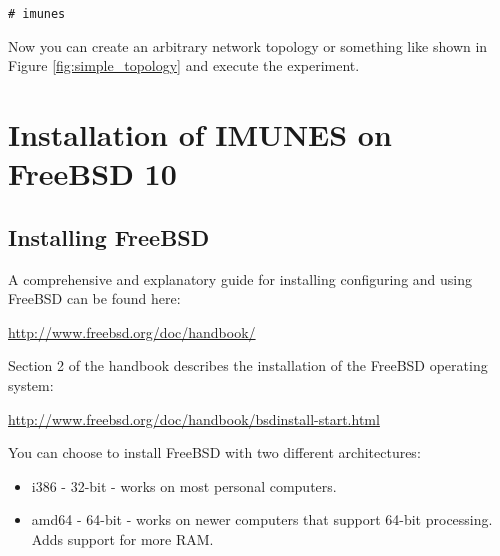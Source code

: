 \texttt{\# imunes}

Now you can create an arbitrary network topology or something like shown in
Figure \ref{fig:simple_topology} and execute the experiment.

\section{Installation of IMUNES on FreeBSD 10}

\subsection{Installing FreeBSD}
A comprehensive and explanatory guide for installing configuring and using
FreeBSD can be found here:

\begin{center}
\url{http://www.freebsd.org/doc/handbook/}
\end{center}

Section 2 of the handbook describes the installation of the FreeBSD operating
system: 
\begin{center}
\url{http://www.freebsd.org/doc/handbook/bsdinstall-start.html}
\end{center}

You can choose to install FreeBSD with two different architectures:
\begin{itemize}
\item i386 - 32-bit - works on most personal computers.
\item amd64 - 64-bit - works on newer computers that support 64-bit processing.
Adds support for more RAM.
\end{itemize}

